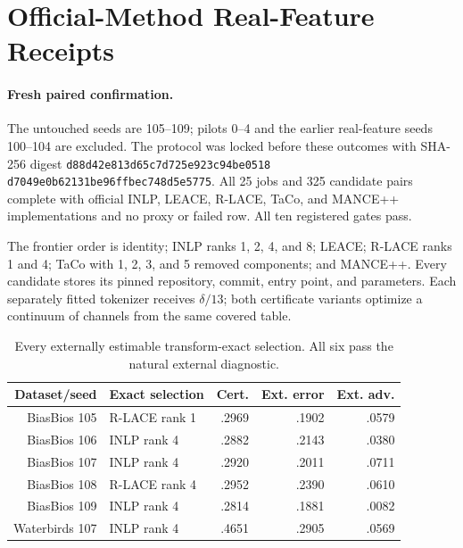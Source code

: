 \section{Official-Method Real-Feature Receipts}

\paragraph{Fresh paired confirmation.}
The untouched seeds are 105--109; pilots 0--4 and the earlier real-feature
seeds 100--104 are excluded. The protocol was locked before these outcomes with
SHA-256 digest
\texttt{d88d42e813d65c7d725e923c94be0518}\allowbreak
\texttt{d7049e0b62131be96ffbec748d5e5775}. All 25 jobs and 325 candidate pairs
complete with official INLP, LEACE, R-LACE, TaCo, and MANCE++ implementations
and no proxy or failed row. All ten registered gates pass.

The frontier order is identity; INLP ranks 1, 2, 4, and 8; LEACE; R-LACE ranks
1 and 4; TaCo with 1, 2, 3, and 5 removed components; and MANCE++. Every
candidate stores its pinned repository, commit, entry point, and parameters.
Each separately fitted tokenizer receives $\delta/13$; both certificate
variants optimize a continuum of channels from the same covered table.

\begin{table}[t]
\centering
\small
\setlength{\tabcolsep}{2.6pt}
\begin{tabular}{rlrrr}
\hline
Dataset/seed & Exact selection & Cert. & Ext. error & Ext. adv. \\
\hline
BiasBios 105 & R-LACE rank 1 & .2969 & .1902 & .0579 \\
BiasBios 106 & INLP rank 4 & .2882 & .2143 & .0380 \\
BiasBios 107 & INLP rank 4 & .2920 & .2011 & .0711 \\
BiasBios 108 & R-LACE rank 4 & .2952 & .2390 & .0610 \\
BiasBios 109 & INLP rank 4 & .2814 & .1881 & .0082 \\
Waterbirds 107 & INLP rank 4 & .4651 & .2905 & .0569 \\
\hline
\end{tabular}
\caption{Every externally estimable transform-exact selection. All six pass
the natural external diagnostic.}
\label{supp:tab:exact-estimable-selections}
\end{table}

